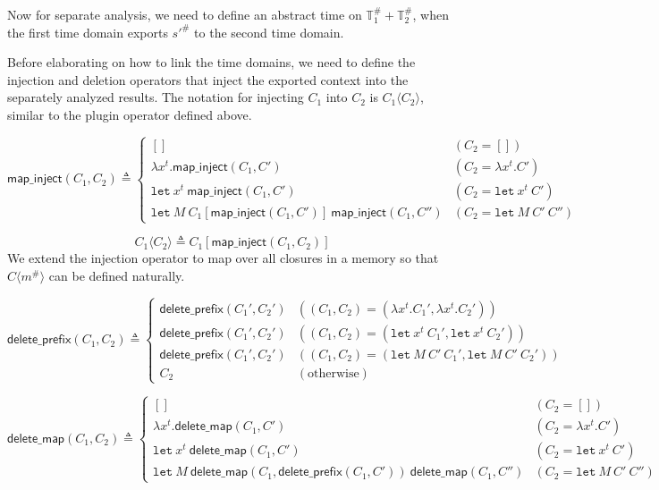 \documentclass{article}
\theoremstyle{definition}
\newcommand*{\A}[1]{{#1}^{\#}}
\newcommand*{\Time}{\mathbb{T}}
\newcommand*{\ATime}{\A{\Time}}
\newcommand*{\mem}{m}
\newcommand*{\mapinject}{\mathsf{map\_inject}}
\newcommand*{\inject}[2]{{#1}\langle{#2}\rangle}
\newcommand*{\deletepre}{\mathsf{delete\_prefix}}
\newcommand*{\deletemap}{\mathsf{delete\_map}}
\newcommand*{\Let}{\mathtt{let}}
\begin{document}
Now for separate analysis, we need to define an abstract time on $\ATime_1+\ATime_2$, when the first time domain exports $\A{s'}$ to the second time domain.

Before elaborating on how to link the time domains, we need to define the injection and deletion operators that inject the exported context into the separately analyzed results.
The notation for injecting $C_{1}$ into $C_{2}$ is $\inject{C_{1}}{C_{2}}$, similar to the plugin operator defined above.

\[
  \mapinject(C_{1},C_{2})\triangleq
  \begin{cases}
    []                                                          & (C_{2}=[])                \\
    \lambda x^{t}. \mapinject(C_{1},C')                         & (C_{2}=\lambda x^{t}. C') \\
    \Let\:x^{t}\:\mapinject(C_{1},C')                           & (C_{2}=\Let\:x^{t}\:C')   \\
    \Let\:M\:C_{1}[\mapinject(C_{1},C')]\:\mapinject(C_{1},C'') & (C_{2}=\Let\:M\:C'\:C'')
  \end{cases}
\]

\[
  \inject{C_{1}}{C_{2}}\triangleq C_{1}[\mapinject(C_{1},C_{2})]
\]
We extend the injection operator to map over all closures in a memory so that $\inject{C}{\A\mem}$ can be defined naturally.

\[
  \deletepre(C_{1},C_{2})\triangleq
  \begin{cases}
    \deletepre(C_{1}',C_{2}') & ((C_{1},C_{2})=(\lambda x^{t}.C_{1}',\lambda x^{t}.C_{2}')) \\
    \deletepre(C_{1}',C_{2}') & ((C_{1},C_{2})=(\Let\: x^{t}\:C_{1}',\Let\:x^{t}\:C_{2}'))  \\
    \deletepre(C_{1}',C_{2}') & ((C_{1},C_{2})=(\Let\:M\:C'\:C_{1}',\Let\:M\:C'\:C_{2}'))   \\
    C_{2}                     & (\text{otherwise})
  \end{cases}
\]

\[
  \deletemap(C_{1},C_{2})\triangleq
  \begin{cases}
    []                                                                     & (C_{2}=[])               \\
    \lambda x^{t}.\deletemap(C_{1},C')                                     & (C_{2}=\lambda x^{t}.C') \\
    \Let\:x^{t}\:\deletemap(C_{1},C')                                      & (C_{2}=\Let\:x^{t}\:C')  \\
    \Let\:M\:\deletemap(C_{1},\deletepre(C_{1},C'))\:\deletemap(C_{1},C'') & (C_{2}=\Let\:M\:C'\:C'')
  \end{cases}
\]
\end{document}
